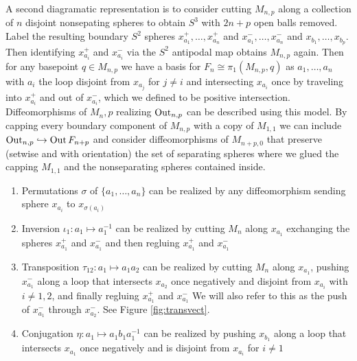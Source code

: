 A second diagramatic representation is to consider cutting
$M_{n,p}$ along a collection of $n$ disjoint nonsepating spheres
to obtain $S^3$ with $2n+p$ open balls removed.
Label the resulting boundary $S^2$ spheres
$x^+_{a_1},\ldots,x^+_{a_n}$
and
$x^-_{a_1},\ldots,x^-_{a_n}$
and
$x_{b_1},\ldots,x_{b_p}$.
Then identifying $x^+_{a_i}$ and $x^-_{a_i}$ via the $S^2$ antipodal map obtains $M_{n,p}$ again.
Then for any basepoint $q \in M_{n,p}$
we have a basis for $F_n \cong \pi_1(M_{n,p},q)$
as $a_1, \ldots, a_n$
with $a_i$ the loop disjoint from $x_{a_j}$ for $j \neq i$
and intersecting $x_{a_i}$ once by traveling into
$x^+_{a_i}$
and out of
$x^-_{a_i}$, which we defined to be positive intersection.
Diffeomorphisms of $M_n,p$ realizing $\operatorname{Out}_{n,p}$
can be described using this model.
By capping every boundary component of
$M_{n,p}$ with a copy of $M_{1,1}$
we can include
 $\operatorname{Out}_{n,p} \hookrightarrow \operatorname{Out} F_{n+p}$
and consider diffeomorphisms of $M_{n+p,0}$
that preserve (setwise and with orientation) the set of separating spheres
where we glued the capping $M_{1,1}$ and the nonseparating spheres contained inside.

\begin{enumerate}
  \item Permutations $\sigma$ of $\{a_1,\ldots,a_n\}$ can be realized by any
  diffeomorphism sending sphere $x_{a_i}$ to $x_{\sigma(a_i)}$
  \item Inversion $\iota_1: a_1 \mapsto a_1^{-1}$
  can be realized by cutting $M_n$ along $x_{a_1}$
  exchanging the spheres $x^+_{a_1}$ and $x^-_{a_1}$
  and then regluing $x^+_{a_1}$ and $x^-_{a_1}$
  \item Transposition $\tau_{12}: a_1 \mapsto a_1a_2$
  can be realized by cutting $M_n$ along $x_{a_1}$,
  pushing $x^-_{a_1}$ along a loop that intersects $x_{a_2}$
  once negatively and disjoint from $x_{a_i}$ with $i\neq 1,2$,
  and finally regluing $x^+_{a_1}$ and $x^-_{a_1}$
  We will also refer to this as the push of $x^-_{a_1}$ through $x^-_{a_2}$.
  See Figure \ref{fig:transvect}.
  \item Conjugation $\eta: a_1 \mapsto a_1b_1a_1^{-1}$
  can be realized by  pushing $x_{b_1}$ along a loop that intersects $x_{a_1}$ once negatively and is disjoint from $x_{a_i}$ for $i \neq 1$
\end{enumerate}

